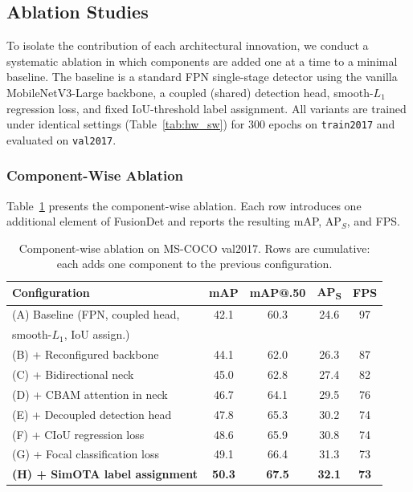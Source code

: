 
\subsection{Ablation Studies}

To isolate the contribution of each architectural innovation,
we conduct a systematic ablation in which components are added
one at a time to a minimal baseline.  The baseline is a
standard FPN single-stage detector using the vanilla
MobileNetV3-Large backbone, a coupled (shared) detection head,
smooth-$L_1$ regression loss, and fixed IoU-threshold label
assignment.  All variants are trained under identical settings
(Table~\ref{tab:hw_sw}) for 300 epochs on \texttt{train2017}
and evaluated on \texttt{val2017}.

\subsubsection{Component-Wise Ablation}

Table~\ref{tab:ablation} presents the component-wise ablation.
Each row introduces one additional element of FusionDet and
reports the resulting mAP, $\text{AP}_S$, and FPS.

\begin{table}[!t]
\centering
\caption{Component-wise ablation on MS-COCO val2017.
Rows are cumulative: each adds one component to the previous
configuration.}
\label{tab:ablation}
\renewcommand{\arraystretch}{1.2}
\setlength{\tabcolsep}{3pt}
\begin{tabular}{l c c c c}
\hline\hline
\textbf{Configuration} & \textbf{mAP} &
\textbf{mAP@.50} & \textbf{AP\textsubscript{S}} &
\textbf{FPS} \\
\hline
(A) Baseline (FPN, coupled head,         & 42.1 & 60.3 & 24.6 & 97 \\
\quad smooth-$L_1$, IoU assign.)           &      &      &      &    \\
(B) + Reconfigured backbone              & 44.1 & 62.0 & 26.3 & 87 \\
(C) + Bidirectional neck                 & 45.0 & 62.8 & 27.4 & 82 \\
(D) + CBAM attention in neck             & 46.7 & 64.1 & 29.5 & 76 \\
(E) + Decoupled detection head           & 47.8 & 65.3 & 30.2 & 74 \\
(F) + CIoU regression loss               & 48.6 & 65.9 & 30.8 & 74 \\
(G) + Focal classification loss          & 49.1 & 66.4 & 31.3 & 73 \\
\textbf{(H) + SimOTA label assignment}   &
\textbf{50.3} & \textbf{67.5} & \textbf{32.1} & \textbf{73} \\
\hline\hline
\end{tabular}
\end{table}

